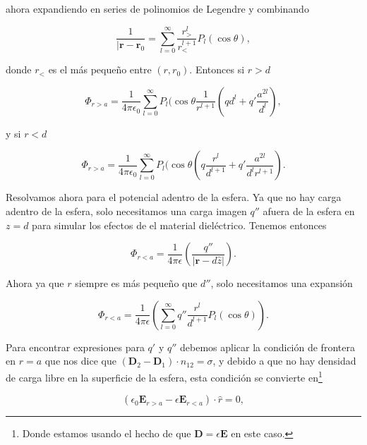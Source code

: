 \documentclass[a4paper,11pt]{article}
\numberwithin{equation}{section}
\begin{document}
ahora expandiendo en series de polinomios de Legendre y combinando

\begin{equation}
 \frac{1}{|\mathbf{r} - \mathbf{r}_0} = 
 \sum_{l=0}^\infty \frac{r_{>}^l}{r_{<}^{l+1}}P_l(\cos{\theta}),
\end{equation}

donde $r_{<}$ es el más pequeño entre $(r,r_0)$. Entonces si $r > d$ 

\begin{equation}
 \Phi_{r > a} = \frac{1}{4\pi\epsilon_0}\sum_{l=0}^\infty P_l(\cos{\theta} 
 \frac{1}{r^{l+1}} \left(qd^l + q'\frac{a^{2l}}{d^l}\right),
\end{equation}

y si $r < d$

\begin{equation}
  \Phi_{r > a} = \frac{1}{4\pi\epsilon_0}\sum_{l=0}^\infty P_l(\cos{\theta} 
  \left(q\frac{r^l}{d^{l+1}} + q'\frac{a^{2l}}{d^lr^{l+1}} \right).
\end{equation}

Resolvamos ahora para el potencial adentro de la esfera. Ya que no hay carga adentro 
de la esfera, solo necesitamos una carga imagen $q''$ afuera de la esfera en $z=d$ 
para simular los efectos de el material dieléctrico. Tenemos entonces 

\begin{equation}
 \Phi_{r < a} = \frac{1}{4\pi\epsilon}\left(\frac{q''}{|\mathbf{r} - d\hat{z}|}\right). 
\end{equation}

Ahora ya que $r$ siempre es más pequeño que $d''$, solo necesitamos una expansión 

\begin{equation}
 \Phi_{r < a} = \frac{1}{4\pi\epsilon}\left(\sum_{l=0}^\infty q'' 
 \frac{r^l}{d^{l+1}}P_l(\cos{\theta})\right).
\end{equation}

Para encontrar expresiones para $q'$ y $q''$ debemos aplicar la condición de 
frontera en $r = a$ que nos dice que $(\mathbf{D}_2 
- \mathbf{D}_1)\cdot n_{12} = \sigma$, y debido a que no hay densidad de carga 
libre en la superficie de la esfera, esta condición se convierte en\footnote{Donde 
estamos usando el hecho de que $\mathbf{D} = \epsilon \mathbf{E}$ en este caso.}

\begin{equation}
 \left(\epsilon_0 \mathbf{E}_{r > a} - \epsilon \mathbf{E}_{r < a}\right)\cdot \hat{r} = 0,
\end{equation}
\end{document}
